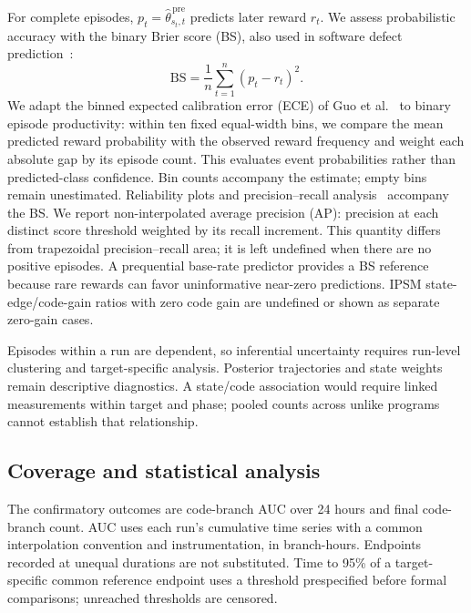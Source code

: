 \documentclass[final,5p,times,number]{elsarticle}
\begin{document}
For complete episodes, $p_t=\widehat{\theta}_{s_t,t}^{\,\mathrm{pre}}$ predicts later reward $r_t$. We assess probabilistic accuracy with the binary Brier score (BS), also used in software defect prediction~\cite{validation2017}:
\begin{equation}
\mathrm{BS}=\frac{1}{n}\sum_{t=1}^{n}(p_t-r_t)^2.
\end{equation}
We adapt the binned expected calibration error (ECE) of Guo et al.~\cite{guo2017calibration} to binary episode productivity: within ten fixed equal-width bins, we compare the mean predicted reward probability with the observed reward frequency and weight each absolute gap by its episode count. This evaluates event probabilities rather than predicted-class confidence. Bin counts accompany the estimate; empty bins remain unestimated. Reliability plots and precision--recall analysis~\cite{davis2006pr} accompany the BS. We report non-interpolated average precision (AP): precision at each distinct score threshold weighted by its recall increment. This quantity differs from trapezoidal precision--recall area; it is left undefined when there are no positive episodes. A prequential base-rate predictor provides a BS reference because rare rewards can favor uninformative near-zero predictions. IPSM state-edge/code-gain ratios with zero code gain are undefined or shown as separate zero-gain cases.

Episodes within a run are dependent, so inferential uncertainty requires run-level clustering and target-specific analysis. Posterior trajectories and state weights remain descriptive diagnostics. A state/code association would require linked measurements within target and phase; pooled counts across unlike programs cannot establish that relationship.

\subsection{Coverage and statistical analysis}
The confirmatory outcomes are code-branch AUC over 24 hours and final code-branch count. AUC uses each run's cumulative time series with a common interpolation convention and instrumentation, in branch-hours. Endpoints recorded at unequal durations are not substituted. Time to 95\% of a target-specific common reference endpoint uses a threshold prespecified before formal comparisons; unreached thresholds are censored.
\end{document}
